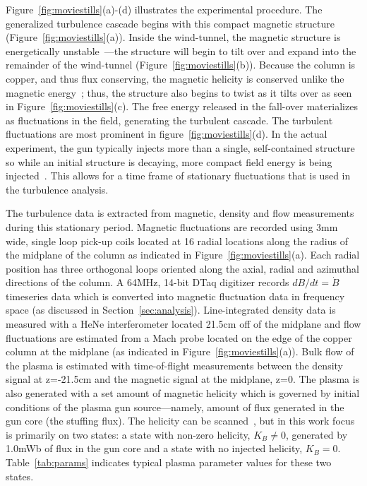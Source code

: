 \documentclass[aip,prl,amsmath,amssymb,reprint,superscriptaddress]{revtex4-1} %
\begin{document}
Figure~\ref{fig:moviestills}(a)-(d) illustrates the experimental procedure. The generalized turbulence cascade begins with this compact magnetic structure (Figure~\ref{fig:moviestills}(a)). Inside the wind-tunnel, the magnetic structure is energetically unstable~\cite{jarboe93}---the structure will begin to tilt over and expand into the remainder of the wind-tunnel (Figure~\ref{fig:moviestills}(b)). Because the column is copper, and thus flux conserving, the magnetic helicity is conserved unlike the magnetic energy~\cite{taylor86}; thus, the structure also begins to twist as it tilts over as seen in Figure~\ref{fig:moviestills}(c). The free energy released in the fall-over materializes as fluctuations in the field, generating the turbulent cascade. The turbulent fluctuations are most prominent in figure~\ref{fig:moviestills}(d). In the actual experiment, the gun typically injects more than a single, self-contained structure so while an initial structure is decaying, more compact field energy is being injected~\cite{barnes86}. This allows for a time frame of stationary fluctuations that is used in the turbulence analysis.

The turbulence data is extracted from magnetic, density and flow measurements during this stationary period. Magnetic fluctuations are recorded using 3mm wide, single loop pick-up coils located at 16 radial locations along the radius of the midplane of the column as indicated in Figure~\ref{fig:moviestills}(a). Each radial position has three orthogonal loops oriented along the axial, radial and azimuthal directions of the column. A 64MHz, 14-bit DTaq digitizer records $dB/dt = \dot{B}$ timeseries data which is converted into magnetic fluctuation data in frequency space (as discussed in Section~\ref{sec:analysis}). Line-integrated density data is measured with a HeNe interferometer located 21.5cm off of the midplane and flow fluctuations are estimated from a Mach probe located on the edge of the copper column at the midplane (as indicated in Figure~\ref{fig:moviestills}(a)). Bulk flow of the plasma is estimated with time-of-flight measurements between the density signal at z=-21.5cm and the magnetic signal at the midplane, z=0. The plasma is also generated with a set amount of magnetic helicity which is governed by initial conditions of the plasma gun source---namely, amount of flux generated in the gun core (the stuffing flux). The helicity can be scanned~\cite{schaffner14b}, but in this work focus is primarily on two states: a state with non-zero helicity, $K_{B}\neq 0$, generated by 1.0mWb of flux in the gun core and a state with no injected helicity, $K_{B}=0$. Table~\ref{tab:params} indicates typical plasma parameter values for these two states.
\end{document}
